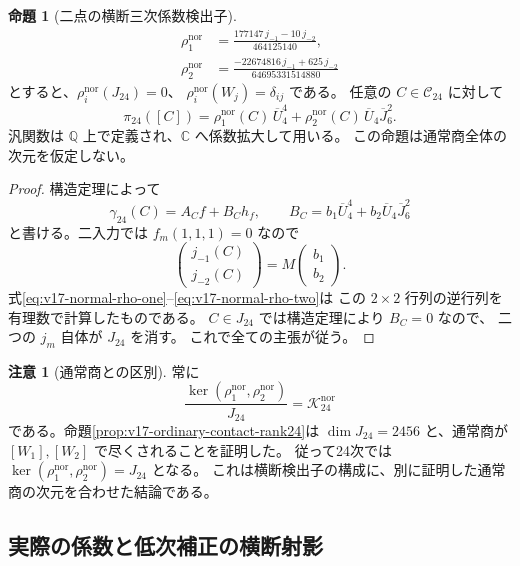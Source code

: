 \documentclass[a4paper,11pt]{ltjsarticle}
\theoremstyle{definition}
\newtheorem{remark}[theorem]{注意}
\newtheorem{proposition}[theorem]{命題}
\begin{document}
\begin{proposition}[二点の横断三次係数検出子]
\label{prop:v17-normal-jet-detectors}
\begin{align}
 \rho_1^{\mathrm{nor}}
   &=\frac{177147\,j_{-1}-10\,j_{-2}}{464125140},
       \label{eq:v17-normal-rho-one}\\
 \rho_2^{\mathrm{nor}}
   &=\frac{-22674816\,j_{-1}+625\,j_{-2}}{64695331514880}
       \label{eq:v17-normal-rho-two}
\end{align}
とすると、$\rho_i^{\mathrm{nor}}(J_{24})=0$、
$\rho_i^{\mathrm{nor}}(W_j)=\delta_{ij}$ である。
任意の $C\in\mathcal C_{24}$ に対して
\[
 \pi_{24}([C])
  =\rho_1^{\mathrm{nor}}(C)\,\overline U_4^4
       +\rho_2^{\mathrm{nor}}(C)\,\overline U_4\overline J_6^2.
\]
汎関数は $\mathbb Q$ 上で定義され、$\mathbb C$ へ係数拡大して用いる。
この命題は通常商全体の次元を仮定しない。
\end{proposition}

\begin{proof}
構造定理によって
\[
 \gamma_{24}(C)=A_C f+B_C h_f,\qquad
 B_C=b_1\overline U_4^4+b_2\overline U_4\overline J_6^2
\]
と書ける。二入力では $f_m(1,1,1)=0$ なので
\[
 \begin{pmatrix}j_{-1}(C)\\j_{-2}(C)\end{pmatrix}
       =M\begin{pmatrix}b_1\\b_2\end{pmatrix}.
\]
式\eqref{eq:v17-normal-rho-one}--\eqref{eq:v17-normal-rho-two}は
この $2\times2$ 行列の逆行列を有理数で計算したものである。
$C\in J_{24}$ では構造定理により $B_C=0$ なので、
二つの $j_m$ 自体が $J_{24}$ を消す。
これで全ての主張が従う。
\end{proof}

\begin{remark}[通常商との区別]
常に
\[
 \frac{\ker(\rho_1^{\mathrm{nor}},\rho_2^{\mathrm{nor}})}{J_{24}}
                      =\mathcal K_{24}^{\mathrm{nor}}
\]
である。命題\ref{prop:v17-ordinary-contact-rank24}は
$\dim J_{24}=2456$ と、通常商が $[W_1],[W_2]$ で尽くされることを証明した。
従って24次では
$\ker(\rho_1^{\mathrm{nor}},\rho_2^{\mathrm{nor}})=J_{24}$ となる。
これは横断検出子の構成に、別に証明した通常商の次元を合わせた結論である。
\end{remark}

\subsection{実際の係数と低次補正の横断射影}
\end{document}

